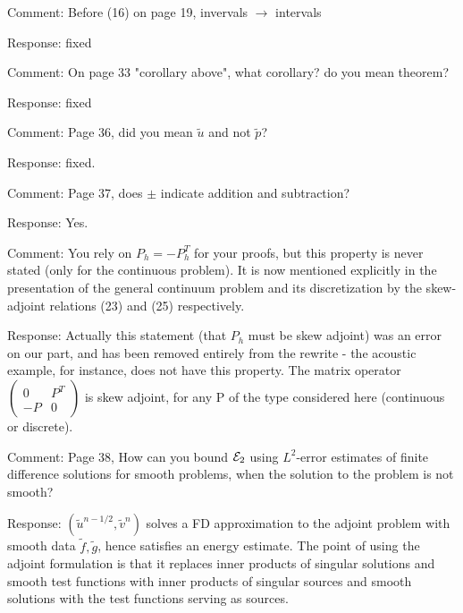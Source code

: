 
Comment: Before (16) on page 19, invervals $\rightarrow$ intervals 

Response: fixed

Comment: On page 33 "corollary above", what corollary? do you mean theorem? 

Response: fixed

Comment: Page 36, did you mean $\tilde{u}$ and not $\tilde{p}$?  

Response: fixed.  

Comment: Page 37, does $\pm$ indicate addition and subtraction?  

Response: Yes. 

Comment:  You rely on $P_h = -P_h^T$ for your proofs, but this property is never stated (only for the continuous problem).  It is now mentioned explicitly in the presentation of the general continuum problem and its discretization by the skew-adjoint relations (23) and (25) respectively.  

Response: Actually this statement (that $P_h$ must be skew adjoint) was an error on our part, and has been removed entirely from the rewrite - the acoustic example, for instance, does not have this property. The matrix operator $\left(\begin{array}{cc}0 & P^T\\-P & 0\end{array}\right)$ is skew adjoint, for any P of the type considered here (continuous or discrete). 

Comment: Page 38, How can you bound ${\cal E}_2$ using $L^2$-error estimates of finite difference solutions for smooth problems, when the solution to the problem is not smooth? 

Response: $(\tilde{u}^{n-1/2},\tilde{v}^n)$ solves a FD approximation to the adjoint problem with smooth data $\tilde{f},\tilde{g}$, hence satisfies an energy estimate. The point of using the adjoint formulation is that it replaces inner products of  singular solutions and smooth test functions with inner products of singular sources and smooth solutions with the test functions serving as sources.

